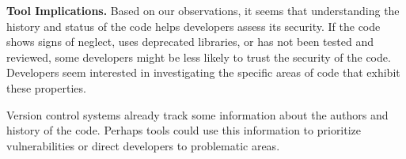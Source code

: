 \documentclass[conference]{IEEEtran}
\begin{document}


% 

\noindent\textbf{Tool Implications.}
Based on our observations, it seems that understanding the history and status of the code helps developers assess its security.
If the code shows signs of neglect, uses deprecated libraries, or has not been tested and reviewed, some developers might be less likely to trust the security of the code.
Developers seem interested in investigating the specific areas of code that exhibit these properties. 

Version control systems already track some information about the authors and history of the code.
Perhaps tools could use this information to prioritize vulnerabilities or direct developers to problematic areas.
\end{document}
